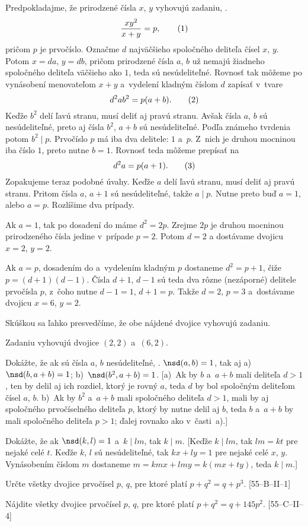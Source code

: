 {%
Predpokladajme, že prirodzené čísla $x$, $y$ vyhovujú zadaniu, \tj.
$$
\frac{xy^2}{x+y}=p,
\tag1
$$
pričom $p$ je prvočíslo. Označme $d$ najväčšieho spoločného deliteľa čísel $x$, $y$. Potom $x=da$, $y=db$, pričom prirodzené čísla $a$, $b$ už nemajú žiadneho spoločného deliteľa väčšieho ako $1$, teda sú nesúdeliteľné. Rovnosť  tak môžeme po vynásobení menovateľom $x+y$ a~vydelení kladným číslom $d$ zapísať v~tvare
$$
d^2ab^2 = p(a+b).
\tag2
$$
Keďže $b^2$ delí ľavú stranu, musí deliť aj pravú stranu. Avšak čísla $a$, $b$ sú nesúdeliteľné, preto aj čísla $b^2$, $a+b$ sú nesúdeliteľné. Podľa známeho tvrdenia potom $b^2\mid p$. Prvočíslo $p$ má iba dva delitele: $1$ a~$p$. Z~nich je druhou mocninou iba číslo $1$, preto nutne $b=1$. Rovnosť  teda môžeme prepísať na
$$
d^2a=p(a+1).
\tag3
$$
Zopakujeme teraz podobné úvahy. Keďže $a$ delí ľavú stranu, musí deliť aj pravú stranu. Pritom čísla $a$, $a+1$ sú nesúdeliteľné, takže $a\mid p$. Nutne preto buď $a=1$, alebo $a=p$. Rozlíšime dva prípady.

Ak $a=1$, tak po dosadení do  máme $d^2=2p$. Zrejme $2p$ je druhou mocninou prirodzeného čísla jedine v~prípade $p=2$. Potom $d=2$ a dostávame dvojicu $x=2$, $y=2$.

Ak $a=p$, dosadením do  a~vydelením kladným $p$ dostaneme $d^2=p+1$, čiže $p=(d+1)(d-1)$. Čísla $d+1$, $d-1$ sú teda dva rôzne (nezáporné) delitele prvočísla $p$, z~čoho nutne $d-1=1$, $d+1=p$. Takže $d=2$, $p=3$ a~dostávame dvojicu $x=6$, $y=2$.

Skúškou sa ľahko presvedčíme, že obe nájdené dvojice vyhovujú zadaniu.

\zaver
Zadaniu vyhovujú dvojice $(2,2)$ a~$(6,2)$.

Dokážte, že ak sú čísla $a$, $b$ nesúdeliteľné, \tj. $\nsd(a,b)=1$, tak aj a)~$\nsd(b,a+b)=1$; b)~$\nsd(b^2,a+b)=1$. [a)~Ak by $b$ a~$a+b$ mali deliteľa $d>1$, ten by delil aj ich rozdiel, ktorý je rovný $a$, teda $d$ by bol spoločným deliteľom čísel $a$, $b$. b)~Ak by $b^2$ a~$a+b$ mali spoločného deliteľa $d>1$, mali by aj spoločného prvočíselného deliteľa $p$, ktorý by nutne delil aj $b$, teda $b$ a~$a+b$ by mali spoločného deliteľa $p>1$; ďalej rovnako ako v~časti~a).]

Dokážte, že ak $\nsd(k,l)=1$ a~$k\mid lm$, tak $k\mid m$. [Keďže $k\mid lm$, tak $lm=kt$ pre nejaké celé $t$. Keďže $k$, $l$ sú nesúdeliteľné, tak $kx+ly=1$ pre nejaké celé $x$, $y$. Vynásobením číslom $m$ dostaneme $m=kmx+lmy=k(mx+ty)$, teda $k\mid m$.]

\D
Určte všetky dvojice prvočísel $p$, $q$, pre ktoré platí $p+q^2=q+p^3$. [55--B--II--1]

Nájdite všetky dvojice prvočísel $p$, $q$, pre ktoré platí $p+q^{2}=q+145p^{2}$. [55--C--II--4]
}

